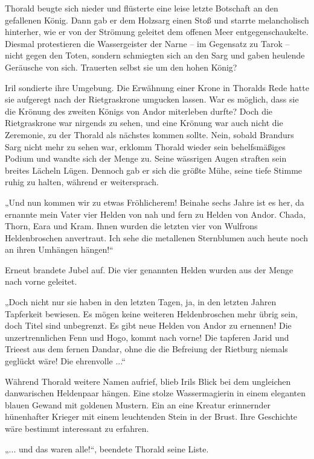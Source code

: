 Thorald beugte sich nieder und flüsterte eine leise letzte Botschaft an den gefallenen König. Dann gab er dem Holzsarg einen Stoß und starrte melancholisch hinterher, wie er von der Strömung geleitet dem offenen Meer entgegenschaukelte. Diesmal protestieren die Wassergeister der Narne – im Gegensatz zu Tarok – nicht gegen den Toten, sondern schmiegten sich an den Sarg und gaben heulende Geräusche von sich. Trauerten selbst sie um den hohen König?

Iril sondierte ihre Umgebung. Die Erwähnung einer Krone in Thoralds Rede hatte sie aufgeregt nach der Rietgraskrone umgucken lassen. War es möglich, dass sie die Krönung des zweiten Königs von Andor miterleben durfte? Doch die Rietgraskrone war nirgends zu sehen, und eine Krönung war auch nicht die Zeremonie, zu der Thorald als nächstes kommen sollte. Nein, sobald Brandurs Sarg nicht mehr zu sehen war, erklomm Thorald wieder sein behelfsmäßiges Podium und wandte sich der Menge zu. Seine wässrigen Augen straften sein breites Lächeln Lügen. Dennoch gab er sich die größte Mühe, seine tiefe Stimme ruhig zu halten, während er weitersprach.

„Und nun kommen wir zu etwas Fröhlicherem! Beinahe sechs Jahre ist es her, da ernannte mein Vater vier Helden von nah und fern zu Helden von Andor. Chada, Thorn, Eara und Kram. Ihnen wurden die letzten vier von Wulfrons Heldenbroschen anvertraut. Ich sehe die metallenen Sternblumen auch heute noch an ihren Umhängen hängen!“

Erneut brandete Jubel auf. Die vier genannten Helden wurden aus der Menge nach vorne geleitet.

„Doch nicht nur sie haben in den letzten Tagen, ja, in den letzten Jahren Tapferkeit bewiesen. Es mögen keine weiteren Heldenbroschen mehr übrig sein, doch Titel sind unbegrenzt. Es gibt neue Helden von Andor zu ernennen! Die unzertrennlichen Fenn und Hogo, kommt nach vorne! Die tapferen Jarid und Trieest aus dem fernen Dandar, ohne die die Befreiung der Rietburg niemals geglückt wäre! Die ehrenvolle ...“

Während Thorald weitere Namen aufrief, blieb Irils Blick bei dem ungleichen danwarischen Heldenpaar hängen. Eine stolze Wassermagierin in einem eleganten blauen Gewand mit goldenen Mustern. Ein an eine Kreatur erinnernder hünenhafter Krieger mit einem leuchtenden Stein in der Brust. Ihre Geschichte wäre bestimmt interessant zu erfahren.

„... und das waren alle!“, beendete Thorald seine Liste.

